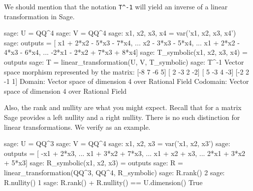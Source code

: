 We should mention that the notation \verb?T^-1? will yield an inverse of a linear transformation in Sage.
%
\begin{sageexample}
sage: U = QQ^4
sage: V = QQ^4
sage: x1, x2, x3, x4 = var('x1, x2, x3, x4')
sage: outputs = [   x1 + 2*x2 - 5*x3 - 7*x4,
...                        x2 - 3*x3 - 5*x4,
...                 x1 + 2*x2 - 4*x3 - 6*x4,
...              -2*x1 - 2*x2 + 7*x3 + 8*x4]
sage: T_symbolic(x1, x2, x3, x4) = outputs
sage: T = linear_transformation(U, V, T_symbolic)
sage: T^-1
Vector space morphism represented by the matrix:
[-8  7 -6  5]
[ 2 -3  2 -2]
[ 5 -3  4 -3]
[-2  2 -1  1]
Domain: Vector space of dimension 4 over Rational Field
Codomain: Vector space of dimension 4 over Rational Field
\end{sageexample}
%
Also, the rank and nullity are what you might expect.  Recall that for a matrix Sage provides a left nullity and a right nullity.  There is no such distinction for linear transformations.  We verify  as an example.
%
\begin{sageexample}
sage: U = QQ^3
sage: V = QQ^4
sage: x1, x2, x3 = var('x1, x2, x3')
sage: outputs = [ -x1        + 2*x3,
...                x1 + 3*x2 + 7*x3,
...                x1 +   x2 +   x3,
...              2*x1 + 3*x2 + 5*x3]
sage: R_symbolic(x1, x2, x3) = outputs
sage: R = linear_transformation(QQ^3, QQ^4, R_symbolic)
sage: R.rank()
2
sage: R.nullity()
1
sage: R.rank() + R.nullity() == U.dimension()
True
\end{sageexample}
%
\begin{sageverbatim}
\end{sageverbatim}
%
